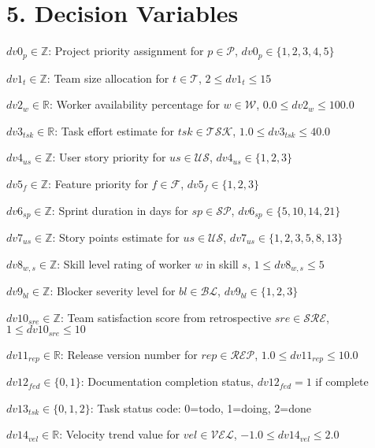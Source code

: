 \documentclass[12pt]{article}
\begin{document}
\section{5. Decision Variables}
\item $ dv0_{p} \in \mathbb{Z} $: Project priority assignment for $ p \in \mathcal{P} $, $ dv0_p \in \{1,2,3,4,5\} $
    \item $ dv1_{t} \in \mathbb{Z} $: Team size allocation for $ t \in \mathcal{T} $, $ 2 \leq dv1_t \leq 15 $
    \item $ dv2_{w} \in \mathbb{R} $: Worker availability percentage for $ w \in \mathcal{W} $, $ 0.0 \leq dv2_w \leq 100.0 $
    \item $ dv3_{tsk} \in \mathbb{R} $: Task effort estimate for $ tsk \in \mathcal{TSK} $, $ 1.0 \leq dv3_{tsk} \leq 40.0 $
    \item $ dv4_{us} \in \mathbb{Z} $: User story priority for $ us \in \mathcal{US} $, $ dv4_{us} \in \{1,2,3\} $
    \item $ dv5_{f} \in \mathbb{Z} $: Feature priority for $ f \in \mathcal{F} $, $ dv5_f \in \{1,2,3\} $
    \item $ dv6_{sp} \in \mathbb{Z} $: Sprint duration in days for $ sp \in \mathcal{SP} $, $ dv6_{sp} \in \{5,10,14,21\} $
    \item $ dv7_{us} \in \mathbb{Z} $: Story points estimate for $ us \in \mathcal{US} $, $ dv7_{us} \in \{1,2,3,5,8,13\} $
    \item $ dv8_{w,s} \in \mathbb{Z} $: Skill level rating of worker $ w $ in skill $ s $, $ 1 \leq dv8_{w,s} \leq 5 $
    \item $ dv9_{bl} \in \mathbb{Z} $: Blocker severity level for $ bl \in \mathcal{BL} $, $ dv9_{bl} \in \{1,2,3\} $
    \item $ dv10_{sre} \in \mathbb{Z} $: Team satisfaction score from retrospective $ sre \in \mathcal{SRE} $, $ 1 \leq dv10_{sre} \leq 10 $
    \item $ dv11_{rep} \in \mathbb{R} $: Release version number for $ rep \in \mathcal{REP} $, $ 1.0 \leq dv11_{rep} \leq 10.0 $
    \item $ dv12_{fed} \in \{0,1\} $: Documentation completion status, $ dv12_{fed} = 1 $ if complete
    \item $ dv13_{tsk} \in \{0,1,2\} $: Task status code: 0=todo, 1=doing, 2=done
    \item $ dv14_{vel} \in \mathbb{R} $: Velocity trend value for $ vel \in \mathcal{VEL} $, $ -1.0 \leq dv14_{vel} \leq 2.0 $
\end{document}
